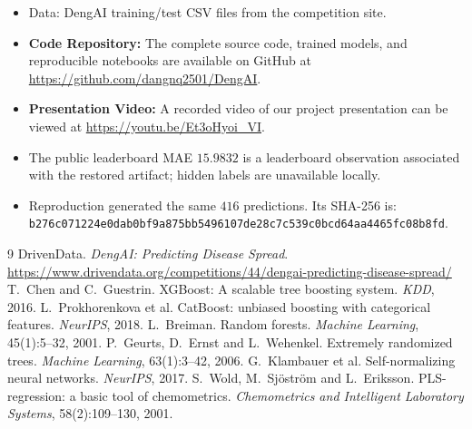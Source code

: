 \documentclass[11pt,a4paper]{article}
\newcommand{\submissionhash}{\texttt{b276c071224e0dab0bf9a875bb5496107}\allowbreak\texttt{de28c7c539c0bcd64aa4465fc08b8fd}}
\begin{document}
\begin{itemize}
  \item Data: DengAI training/test CSV files from the competition site.
  \item \textbf{Code Repository:} The complete source code, trained models, and reproducible notebooks are available on GitHub at \url{https://github.com/dangnq2501/DengAI}.
  \item \textbf{Presentation Video:} A recorded video of our project presentation can be viewed at \url{https://youtu.be/Et3oHyoi_VI}.
  \item The public leaderboard MAE $15.9832$ is a leaderboard observation associated with the restored artifact; hidden labels are unavailable locally.
  \item Reproduction generated the same $416$ predictions. Its SHA-256 is:\newline
  \submissionhash.
\end{itemize}

\begin{thebibliography}{9}
 DrivenData. \emph{DengAI: Predicting Disease Spread}. \url{https://www.drivendata.org/competitions/44/dengai-predicting-disease-spread/}
 T.~Chen and C.~Guestrin. XGBoost: A scalable tree boosting system. \emph{KDD}, 2016.
 L.~Prokhorenkova et al. CatBoost: unbiased boosting with categorical features. \emph{NeurIPS}, 2018.
 L.~Breiman. Random forests. \emph{Machine Learning}, 45(1):5--32, 2001.
 P.~Geurts, D.~Ernst and L.~Wehenkel. Extremely randomized trees. \emph{Machine Learning}, 63(1):3--42, 2006.
 G.~Klambauer et al. Self-normalizing neural networks. \emph{NeurIPS}, 2017.
 S.~Wold, M.~Sj\"ostr\"om and L.~Eriksson. PLS-regression: a basic tool of chemometrics. \emph{Chemometrics and Intelligent Laboratory Systems}, 58(2):109--130, 2001.
\end{thebibliography}
\end{document}
